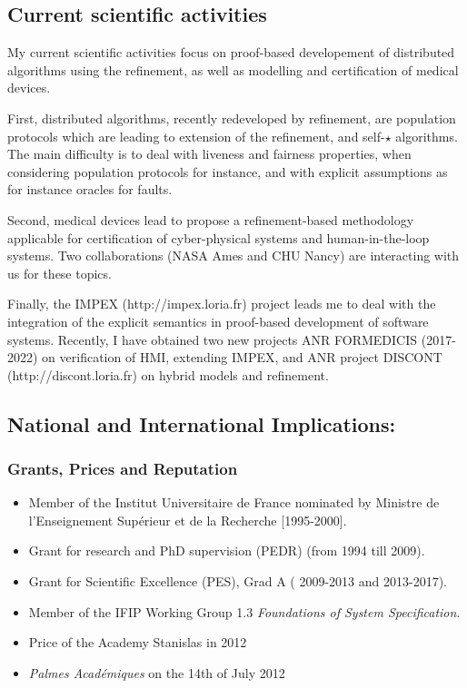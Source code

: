 \documentclass[ 12pt]{article}
\begin{document}
\subsection{Current scientific activities}


  My current  scientific activities focus  on proof-based developement
  of distributed  algorithms  using    the refinement, as     well as
  modelling and certification of medical devices.

  First, distributed  algorithms,  recently redeveloped by refinement,
  are population protocols  which  are  leading  to extension  of  the
  refinement,  and self-$\star$ algorithms. The  main difficulty is to
  deal    with liveness   and   fairness properties,  when  considering
  population protocols for  instance, and with explicit assumptions as for instance 
  oracles for faults.

  Second,   medical  devices  lead  to propose a  refinement-based methodology
  applicable  for   certification    of  cyber-physical  systems   and
  human-in-the-loop  systems.  Two   collaborations (NASA Ames and  CHU
  Nancy) are interacting with us for these topics.



Finally, the IMPEX (http://impex.loria.fr) project leads me to deal with the integration of
the explicit semantics in  proof-based development of software
systems. Recently, I have obtained two new projects ANR FORMEDICIS
(2017-2022) on verification of HMI, extending IMPEX, and ANR project
DISCONT (http://discont.loria.fr)  on hybrid models and  refinement.






\subsection{National and International Implications:}


\subsubsection{Grants, Prices and Reputation}

\begin{itemize}
\item Member of the Institut Universitaire
de France nominated by   Ministre de l'Enseignement Sup\'erieur et de la Recherche [1995-2000].
\item  Grant for research and PhD supervision (PEDR) (from 1994  till  2009).
\item  Grant for Scientific Excellence (PES), Grad A  ( 2009-2013  and  2013-2017).
\item Member of the IFIP Working Group  1.3  \textit{Foundations of System Specification}.
\item Price of the Academy Stanislas in 2012

\item \textit{Palmes Acad\'emiques} on the  14th of  July  2012

\end{itemize}
\end{document}
